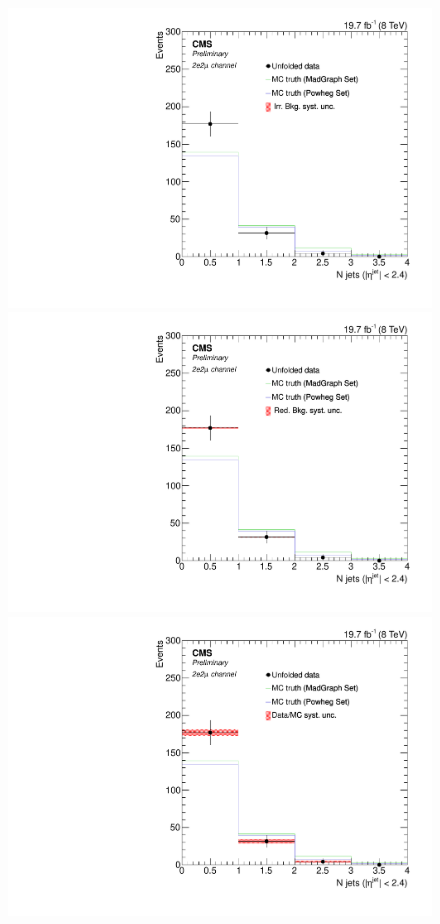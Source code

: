 \begin{figure}[hbtp]
\begin{center}
    \includegraphics[width=0.8\cmsFigWidth]{Figures/Unfolding/Systematics/ZZTo2e2m_CentralJets_IrrBkg_Mad_fr}
    \includegraphics[width=0.8\cmsFigWidth]{Figures/Unfolding/Systematics/ZZTo2e2m_CentralJets_RedBkg_Mad_fr}     
    \includegraphics[width=0.8\cmsFigWidth]{Figures/Unfolding/Systematics/ZZTo2e2m_CentralJets_UnfDataOverGenMC_Mad_fr}     

\end{center}
\end{figure}
